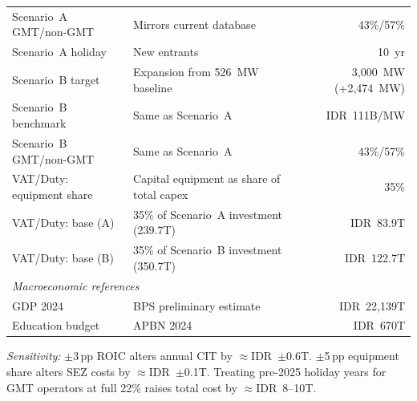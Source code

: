 \documentclass[11pt,english]{article}
\begin{document}
\begin{appendices}
\begin{table}[H]
\begin{threeparttable}
\begin{tabularx}{\textwidth}{l X r}
Scenario~A GMT/non-GMT & Mirrors current database & 43\%/57\% \\
Scenario~A holiday & New entrants & 10~yr \\
Scenario~B target & Expansion from 526~MW baseline & 3{,}000~MW (+2{,}474~MW) \\
Scenario~B benchmark & Same as Scenario~A & IDR~111B/MW \\
Scenario~B GMT/non-GMT & Same as Scenario~A & 43\%/57\% \\
VAT/Duty: equipment share & Capital equipment as share of total capex & 35\% \\
VAT/Duty: base (A) & 35\% of Scenario~A investment (239.7T) & IDR~83.9T \\
VAT/Duty: base (B) & 35\% of Scenario~B investment (350.7T) & IDR~122.7T \\
[4pt]
\multicolumn{3}{l}{\textit{Macroeconomic references}} \\[2pt]
GDP 2024 & BPS preliminary estimate & IDR~22{,}139T \\
Education budget & APBN 2024 & IDR~670T \\
\bottomrule
\end{tabularx}
\begin{tablenotes}
\small
\item \textit{Sensitivity:} $\pm$3\,pp ROIC alters annual CIT by $\approx$IDR~$\pm$0.6T. $\pm$5\,pp equipment share alters SEZ costs by $\approx$IDR~$\pm$0.1T. Treating pre-2025 holiday years for GMT operators at full 22\% raises total cost by $\approx$IDR~8--10T.
\end{tablenotes}
\end{threeparttable}
\end{table}

\end{appendices}
\end{document}
